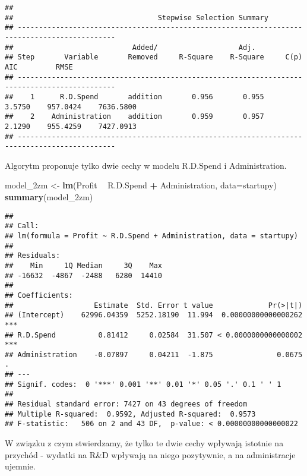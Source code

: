\documentclass[]{book}
\newenvironment{Shaded}{\begin{snugshade}}{\end{snugshade}}
\newcommand{\KeywordTok}[1]{\textcolor[rgb]{0.13,0.29,0.53}{\textbf{#1}}}
\newcommand{\DataTypeTok}[1]{\textcolor[rgb]{0.13,0.29,0.53}{#1}}
\newcommand{\StringTok}[1]{\textcolor[rgb]{0.31,0.60,0.02}{#1}}
\newcommand{\OperatorTok}[1]{\textcolor[rgb]{0.81,0.36,0.00}{\textbf{#1}}}
\newcommand{\NormalTok}[1]{#1}
\begin{document}
\begin{verbatim}
## 
##                                  Stepwise Selection Summary                                   
## ---------------------------------------------------------------------------------------------
##                            Added/                   Adj.                                         
## Step       Variable       Removed     R-Square    R-Square     C(p)       AIC         RMSE       
## ---------------------------------------------------------------------------------------------
##    1      R.D.Spend       addition       0.956       0.955    3.5750    957.0424    7636.5800    
##    2    Administration    addition       0.959       0.957    2.1290    955.4259    7427.0913    
## ---------------------------------------------------------------------------------------------
\end{verbatim}

Algorytm proponuje tylko dwie cechy w modelu R.D.Spend i Administration.

\begin{Shaded}
\begin{Highlighting}[]
\NormalTok{model_2zm <-}\StringTok{ }\KeywordTok{lm}\NormalTok{(Profit }\OperatorTok{~}\StringTok{ }\NormalTok{R.D.Spend }\OperatorTok{+}\StringTok{ }\NormalTok{Administration, }\DataTypeTok{data=}\NormalTok{startupy)}
\KeywordTok{summary}\NormalTok{(model_2zm)}
\end{Highlighting}
\end{Shaded}

\begin{verbatim}
## 
## Call:
## lm(formula = Profit ~ R.D.Spend + Administration, data = startupy)
## 
## Residuals:
##    Min     1Q Median     3Q    Max 
## -16632  -4867  -2488   6280  14410 
## 
## Coefficients:
##                   Estimate  Std. Error t value             Pr(>|t|)    
## (Intercept)    62996.04359  5252.18190  11.994  0.00000000000000262 ***
## R.D.Spend          0.81412     0.02584  31.507 < 0.0000000000000002 ***
## Administration    -0.07897     0.04211  -1.875               0.0675 .  
## ---
## Signif. codes:  0 '***' 0.001 '**' 0.01 '*' 0.05 '.' 0.1 ' ' 1
## 
## Residual standard error: 7427 on 43 degrees of freedom
## Multiple R-squared:  0.9592, Adjusted R-squared:  0.9573 
## F-statistic:   506 on 2 and 43 DF,  p-value: < 0.00000000000000022
\end{verbatim}

W związku z czym stwierdzamy, że tylko te dwie cechy wpływają istotnie
na przychód - wydatki na R\&D wpływają na niego pozytywnie, a na
administracje ujemnie.
\end{document}
